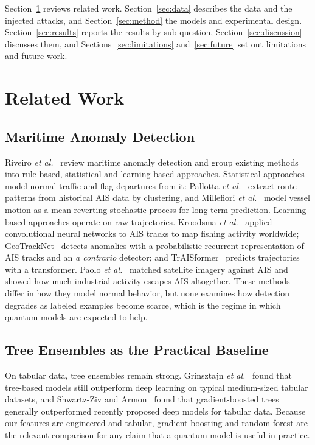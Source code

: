\documentclass[journal]{IEEEtran}
\begin{document}
Section~\ref{sec:related} reviews related work. Section~\ref{sec:data}
describes the data and the injected attacks, and Section~\ref{sec:method} the
models and experimental design. Section~\ref{sec:results} reports the results
by sub-question, Section~\ref{sec:discussion} discusses them, and
Sections~\ref{sec:limitations} and~\ref{sec:future} set out limitations and
future work.

\section{Related Work}
\label{sec:related}

\subsection{Maritime Anomaly Detection}
Riveiro \textit{et al.}~\cite{riveiro2018review} review maritime anomaly
detection and group existing methods into rule-based, statistical and
learning-based approaches. Statistical approaches model normal traffic and flag
departures from it: Pallotta \textit{et al.}~\cite{pallotta2013tread} extract
route patterns from historical AIS data by clustering, and Millefiori
\textit{et al.}~\cite{millefiori2016ou} model vessel motion as a mean-reverting
stochastic process for long-term prediction. Learning-based approaches operate
on raw trajectories. Kroodsma \textit{et al.}~\cite{kroodsma2018fisheries}
applied convolutional neural networks to AIS tracks to map fishing activity
worldwide; GeoTrackNet~\cite{nguyen2021geotracknet} detects anomalies with a
probabilistic recurrent representation of AIS tracks and an \textit{a contrario}
detector; and TrAISformer~\cite{nguyen2021traisformer} predicts trajectories
with a transformer. Paolo \textit{et al.}~\cite{paolo2024satellite} matched
satellite imagery against AIS and showed how much industrial activity escapes
AIS altogether. These methods differ in how they model normal behavior, but none
examines how detection degrades as labeled examples become scarce, which is the
regime in which quantum models are expected to help.

\subsection{Tree Ensembles as the Practical Baseline}
On tabular data, tree ensembles remain strong. Grinsztajn
\textit{et al.}~\cite{grinsztajn2022trees} found that tree-based models still
outperform deep learning on typical medium-sized tabular datasets, and
Shwartz-Ziv and Armon~\cite{shwartzziv2022tabular} found that gradient-boosted
trees generally outperformed recently proposed deep models for tabular data.
Because our features are engineered and tabular, gradient boosting and random
forest are the relevant comparison for any claim that a quantum model is useful
in practice.
\end{document}
